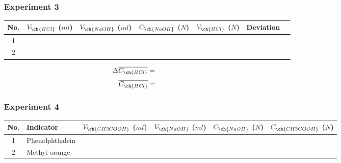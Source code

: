 \subsubsection{Experiment 3}
\begin{table}[ht]
	\centering
	{\renewcommand{\arraystretch}{1.75}
		\begin{tabular}{|c|p{2cm}|p{2cm}|p{2cm}|p{2cm}|p{2cm}|p{2cm}|}
			\hline
			No. & $V_{\ch{HCl}}$ ($ml$)& $V_{\ch{NaOH}}$ ($ml$) & $C_{\ch{NaOH}}$ ($N$) & $V_{\ch{HCl}}$ ($N$) & Deviation \\ \hline
			1 & & & & & \\ \hline
			2 & & & & & \\ \hline
	\end{tabular}}
\end{table}
\vspace{-0.1cm}
\[\Delta \overline{C_{\ch{HCl}}} = \hspace{8.3cm}\] \vspace{0cm}
\[\overline{C_{\ch{HCl}}} = \hspace{8cm}\]

\subsubsection{Experiment 4}
\begin{table}[ht]
	\centering
	{\renewcommand{\arraystretch}{1.75}
		\begin{tabular}{|c|p{3cm}|p{2.5cm}|p{2cm}|p{2cm}|p{2.5cm}|}
			\hline
			No. & Indicator & $V_{\ch{CH3COOH}}$ ($ml$) & $V_{\ch{NaOH}}$ ($ml$) & $C_{\ch{NaOH}}$ ($N$) & $C_{\ch{CH3COOH}}$ ($N$)\\ \hline
			1 & Phenolphthalein & & & & \\ \hline
			2 & Methyl orange & & & & \\ \hline
	\end{tabular}}
\end{table}

